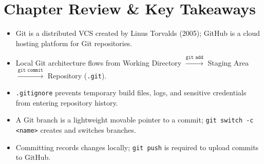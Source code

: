 \section{Chapter Review \& Key Takeaways}
\begin{tcolorbox}[enhanced, colback=boxgreenbg, colframe=boxgreenborder, boxrule=1pt, arc=4pt, title={\bfseries\sffamily Summary Checklist}]
\sffamily\small
\begin{itemize}[leftmargin=1.2em, itemsep=2pt]
    \item Git is a distributed VCS created by Linus Torvalds (2005); GitHub is a cloud hosting platform for Git repositories.
    \item Local Git architecture flows from Working Directory $\xrightarrow{\texttt{git add}}$ Staging Area $\xrightarrow{\texttt{git commit}}$ Repository (\texttt{.git}).
    \item \texttt{.gitignore} prevents temporary build files, logs, and sensitive credentials from entering repository history.
    \item A Git branch is a lightweight movable pointer to a commit; \texttt{git switch -c <name>} creates and switches branches.
    \item Committing records changes locally; \texttt{git push} is required to upload commits to GitHub.
\end{itemize}
\end{tcolorbox}

